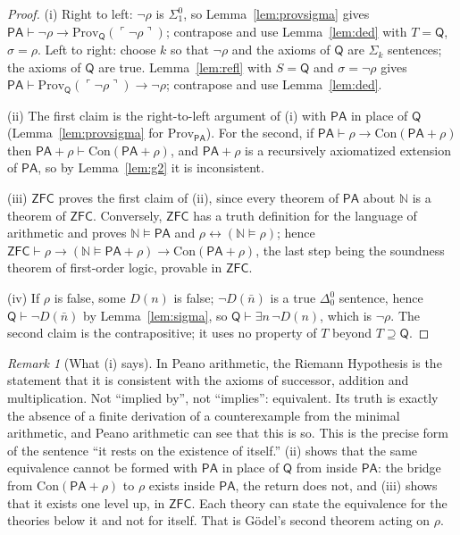 \documentclass[11pt]{article}
\theoremstyle{definition}
\theoremstyle{remark}
\newtheorem{remark}[theorem]{Remark}
\newcommand{\N}{\mathbb N}
\newcommand{\PA}{\mathsf{PA}}
\newcommand{\ZFC}{\mathsf{ZFC}}
\newcommand{\RA}{\mathsf{Q}}
\newcommand{\Prov}{\mathrm{Prov}}
\newcommand{\Con}{\mathrm{Con}}
\newcommand{\gn}[1]{\ulcorner #1\urcorner}
\newcommand{\Sigone}{\Sigma^0_1}
\newcommand{\Dzero}{\Delta^0_0}
\begin{document}
\begin{proof}
(i) Right to left: $\neg\rho$ is $\Sigone$, so Lemma~\ref{lem:provsigma} gives $\PA\vdash\neg\rho\to\Prov_\RA(\gn{\neg\rho})$; contrapose and use Lemma~\ref{lem:ded} with $T=\RA$, $\sigma=\rho$. Left to right: choose $k$ so that $\neg\rho$ and the axioms of $\RA$ are $\Sigma_k$ sentences; the axioms of $\RA$ are true. Lemma~\ref{lem:refl} with $S=\RA$ and $\sigma=\neg\rho$ gives $\PA\vdash\Prov_\RA(\gn{\neg\rho})\to\neg\rho$; contrapose and use Lemma~\ref{lem:ded}.

(ii) The first claim is the right-to-left argument of (i) with $\PA$ in place of $\RA$ (Lemma~\ref{lem:provsigma} for $\Prov_\PA$). For the second, if $\PA\vdash\rho\to\Con(\PA+\rho)$ then $\PA+\rho\vdash\Con(\PA+\rho)$, and $\PA+\rho$ is a recursively axiomatized extension of $\PA$, so by Lemma~\ref{lem:g2} it is inconsistent.

(iii) $\ZFC$ proves the first claim of (ii), since every theorem of $\PA$ about $\N$ is a theorem of $\ZFC$. Conversely, $\ZFC$ has a truth definition for the language of arithmetic and proves $\N\models\PA$ and $\rho\leftrightarrow(\N\models\rho)$; hence $\ZFC\vdash\rho\to(\N\models\PA+\rho)\to\Con(\PA+\rho)$, the last step being the soundness theorem of first-order logic, provable in $\ZFC$.

(iv) If $\rho$ is false, some $D(n)$ is false; $\neg D(\bar n)$ is a true $\Dzero$ sentence, hence $\RA\vdash\neg D(\bar n)$ by Lemma~\ref{lem:sigma}, so $\RA\vdash\exists n\,\neg D(n)$, which is $\neg\rho$. The second claim is the contrapositive; it uses no property of $T$ beyond $T\supseteq\RA$.
\end{proof}

\begin{remark}[What (i) says]
In Peano arithmetic, the Riemann Hypothesis is the statement that it is consistent with the axioms of successor, addition and multiplication. Not ``implied by'', not ``implies'': equivalent. Its truth is exactly the absence of a finite derivation of a counterexample from the minimal arithmetic, and Peano arithmetic can see that this is so. This is the precise form of the sentence ``it rests on the existence of itself.'' (ii) shows that the same equivalence cannot be formed with $\PA$ in place of $\RA$ from inside $\PA$: the bridge from $\Con(\PA+\rho)$ to $\rho$ exists inside $\PA$, the return does not, and (iii) shows that it exists one level up, in $\ZFC$. Each theory can state the equivalence for the theories below it and not for itself. That is G\"odel's second theorem acting on $\rho$.
\end{remark}
\end{document}
